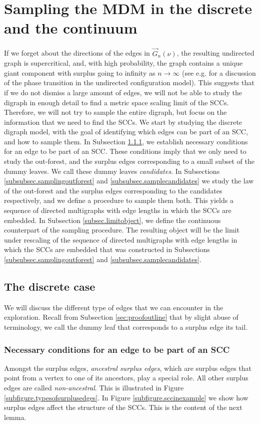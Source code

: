 \section{Sampling the MDM in the discrete and the continuum}
If we forget about the directions of the edges in $\vec{G}_n(\nu)$, the resulting undirected graph is supercritical, and, with high probability, the graph contains a unique giant component with surplus going to infinity as $n\to \infty$ (see e.g. \cite{molloyCriticalPointRandom1995,Molloy1998,Janson2009} for a discussion of the phase transition in the undirected configuration model). This suggests that if we do not dismiss a large amount of edges, we will not be able to study the digraph in enough detail to find a metric space scaling limit of the SCCs. Therefore, we will not try to sample the entire digraph, but focus on the information that we need to find the SCCs. We start by studying the discrete digraph model, with the goal of identifying which edges can be part of an SCC, and how to sample them. In Subsection \ref{subsubsec.defcandidates}, we establish necessary conditions for an edge to be part of an SCC. These conditions imply that we only need to study the out-forest, and the surplus edges corresponding to a small subset of the dummy leaves. We call these dummy leaves \emph{candidates}. In Subsections \ref{subsubsec.samplingoutforest} and \ref{subsubsec.samplecandidates} we study the law of the out-forest and the surplus edges corresponding to the candidates respectively, and we define a procedure to sample them both. This yields a sequence of directed multigraphs with edge lengths in which the SCCs are embedded.  
In Subsection \ref{subsec.limitobject}, we define the continuous counterpart of the sampling procedure. The resulting object will be the limit under rescaling of the sequence of directed multigraphs with edge lengths in which the SCCs are embedded that was constructed in Subsections \ref{subsubsec.samplingoutforest} and \ref{subsubsec.samplecandidates}. 
\subsection{The discrete case}\label{subsec.discrete}
We will discuss the different type of edges that we can encounter in the exploration. Recall from Subsection \ref{sec:proofoutline} that by slight abuse of terminology, we call the dummy leaf that corresponds to a surplus edge its tail.

\subsubsection{Necessary conditions for an edge to be part of an SCC}\label{subsubsec.defcandidates}
Amongst the surplus edges, \emph{ancestral surplus edges}, which are surplus edges that point from a vertex to one of its ancestors, play a special role. All other surplus edges are called \emph{non-ancestral}. This is illustrated in Figure \ref{subfigure.typesofsurplusedges}. In Figure \ref{subfigure.sccinexample} we show how surplus edges affect the structure of the SCCs. This is the content of the next lemma.

